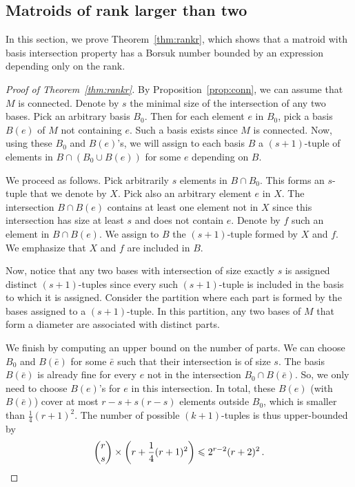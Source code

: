 \documentclass[12pt]{amsart}
\theoremstyle{plain}
\theoremstyle{definition}
\theoremstyle{remark}
\renewcommand{\leq}{\leqslant}
\begin{document}
\subsection{Matroids of rank larger than two}

In this section, we prove Theorem~\ref{thm:rankr}, which shows that a matroid with basis intersection property has a Borsuk number bounded by an expression depending only on the rank.

\begin{proof}[Proof of Theorem~\ref{thm:rankr}]
By Proposition~\ref{prop:conn}, we can assume that $M$ is connected. Denote by $s$ the minimal size of the intersection of any two bases. Pick an arbitrary basis $B_0$. Then for each element $e$ in $B_0$, pick a basis $B(e)$ of $M$ not containing $e$. Such a basis exists since $M$ is connected. Now, using these $B_0$ and $B(e)$’s, we will assign to each basis $B$ a $(s+1)$-tuple of elements in $B \cap (B_0 \cup B(e))$ for some $e$ depending on $B$. 

We proceed as follows. Pick arbitrarily $s$ elements in $B \cap B_0$. This forms an $s$-tuple that we denote by $X$. Pick also an arbitrary element $e$ in $X$. The intersection $B \cap B(e)$ contains at least one element not in $X$ since this intersection has size at least $s$ and does not contain $e$. Denote by $f$ such an element in $B \cap B(e)$. We assign to $B$ the $(s+1)$-tuple formed by $X$ and $f$. We emphasize that $X$ and $f$ are included in $B$.

Now, notice that any two bases with intersection of size exactly $s$ is assigned distinct $(s+1)$-tuples since every such $(s+1)$-tuple is included in the basis to which it is assigned. Consider the partition where each part is formed by the bases assigned to a $(s+1)$-tuple. In this partition, any two bases of $M$ that form a diameter are associated with distinct parts.

We finish by computing an upper bound on the number of parts. We can choose $B_0$ and $B(\bar e)$ for some $\bar e$ such that their intersection is of size $s$. The basis $B(\bar e)$ is already fine for every $e$ not in the intersection $B_0 \cap B(\bar e)$. So, we only need to choose $B(e)$’s for $e$ in this intersection. In total, these $B(e)$ (with $B(\bar e)$) cover at most $r-s + s(r-s)$ elements outside $B_0$, which is smaller than $\frac 1 4 (r+1)^2$. The number of possible $(k+1)$-tuples is thus upper-bounded by 
\[
{r \choose s} \times \left(r+\frac 1 4 (r+1)^2 \right) \leq 2^{r-2} (r+2)^2 \, . \qedhere
\] 
\end{proof}
\end{document}
